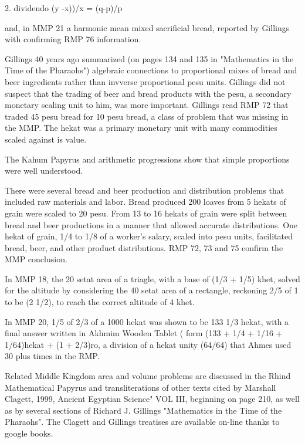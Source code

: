\documentclass[12pt]{article}
\begin{document}
2. dividendo (y -x))/x = (q-p)/p

and, in MMP 21 a harmonic mean mixed sacrificial bread, reported by Gillings with confirming RMP 76 information.

Gillings 40 years ago summarized (on pages 134 and 135 in "Mathematics in the Time of the Pharaohs") algebraic connections to proportional mixes of bread and beer ingredients rather than invverse proportional pesu units. Gillings did not suspect that the trading of beer and bread products with the pesu, a secondary monetary scaling unit to him, was more important. Gillings read RMP 72 that traded  45 pesu bread for 10 pesu bread, a class of problem that was missing in the MMP. The hekat was a primary monetary unit with many commodities scaled against is value.

The Kahum Papyrus and arithmetic progressions show that simple proportions were well understood.

There were several bread and beer production and distribution problems that included raw materials and labor. Bread produced 200 loaves from 5 hekats of grain were scaled to 20 pesu. From 13 to 16 hekats of grain were split between bread and beer productions in a manner that allowed accurate distributions. One hekat of grain, 1/4 to 1/8 of a worker's salary, scaled into pesu units, facilitated bread, beer, and other product distributions. RMP 72, 73 and 75 confirm the MMP conclusion.

In MMP 18, the 20 setat area of a triagle, with a base of (1/3 + 1/5) khet, solved for the altitude by considering the 40 setat area of a rectangle, reckoning 2/5 of 1 to be (2 1/2), to reach the correct altitude of 4 khet. 

In MMP 20, 1/5 of 2/3 of a 1000 hekat was shown to be 133 1/3 hekat, with a final answer written in Akhmim Wooden Tablet ( form (133 + 1/4 + 1/16 + 1/64)hekat + (1 + 2/3)ro, a division of a hekat unity (64/64) that Ahmes used 30 plus times in the RMP. 

Related Middle Kingdom area and volume problems are discussed in the Rhind Mathematical Papyrus and transliterations of other texts cited by Marshall Clagett, 1999, Ancient Egyptian Science" VOL III, beginning on page 210, as well as by several sections of Richard J. Gillings "Mathematics in the Time of the Pharaohs". The Clagett and Gillings treatises  are available on-line thanks to google books.

\end{document}

